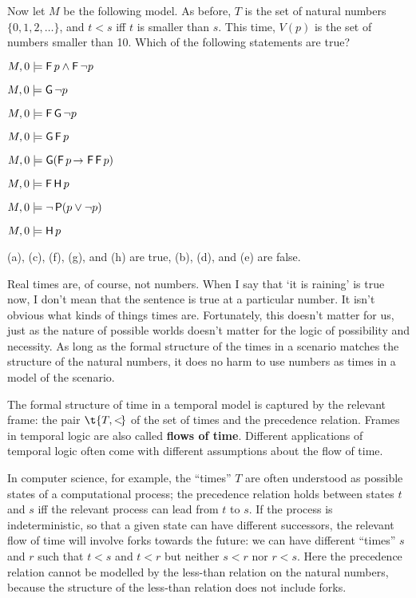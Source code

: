 \begin{exercise}
  Now let $M$ be the following model. As before, $T$ is the set of natural
  numbers $\{ 0,1,2,\ldots \}$, and $t < s$ iff $t$ is smaller than $s$. This
  time, $V(p)$ is the set of numbers smaller than 10. Which of the following
  statements are true?
  \begin{exlist}
  \item $M,0 \models \operatorname{\mathsf{F}} p \land \operatorname{\mathsf{F}} \neg p$ 
  \item $M,0 \models \operatorname{\mathsf{G}} \neg p$
  \item $M,0 \models \operatorname{\mathsf{F}}\operatorname{\mathsf{G}} \neg p$
  \item $M,0 \models \operatorname{\mathsf{G}}\operatorname{\mathsf{F}} p$
  \item $M,0 \models \tG(\tF p \to \tF\tF p)$
  \item $M,0 \models \operatorname{\mathsf{F}}\operatorname{\mathsf{H}} p$
  \item $M,0 \models \neg \operatorname{\mathsf{P}}(p \lor \neg p)$
  \item $M,0 \models \operatorname{\mathsf{H}} p$
  \end{exlist}
  \vspace{-2mm}
\end{exercise}
\begin{solution}
  (a), (c), (f), (g), and (h) are true, (b), (d), and (e) are false. 
\end{solution}

Real times are, of course, not numbers. When I say that `it is raining' is true
now, I don't mean that the sentence is true at a particular number. It isn't
obvious what kinds of things times are. Fortunately, this doesn't matter for us,
just as the nature of possible worlds doesn't matter for the logic of
possibility and necessity. As long as the formal structure of the times in a
scenario matches the structure of the natural numbers, it does no harm to use
numbers as times in a model of the scenario.

The formal structure of time in a temporal model is captured by the relevant
frame: the pair $\t{T,<\!}$ of the set of times and the precedence relation.
Frames in temporal logic are also called \textbf{flows of time}. Different
applications of temporal logic often come with different assumptions about the
flow of time.

In computer science, for example, the ``times'' $T$ are often understood as
possible states of a computational process; the precedence relation holds
between states $t$ and $s$ iff the relevant process can lead from $t$ to $s$. If
the process is indeterministic, so that a given state can have different
successors, the relevant flow of time will involve forks towards the future: we
can have different ``times'' $s$ and $r$ such that $t<s$ and $t<r$ but neither
$s<r$ nor $r<s$. Here the precedence relation cannot be modelled by the
less-than relation on the natural numbers, because the structure of the
less-than relation does not include forks.

